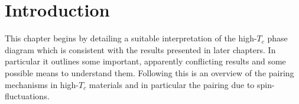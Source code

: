 
\chapter{Introduction}




\begin{chapterabstract}
This chapter begins by detailing a suitable interpretation of the high-$T_c$ phase diagram which is consistent with the results presented in later chapters. In particular it outlines some important, apparently conflicting results and some possible means to understand them. Following this is an overview of the pairing mechanisms in high-$T_c$ materials and in particular the pairing due to spin-fluctuations.
\end{chapterabstract}








